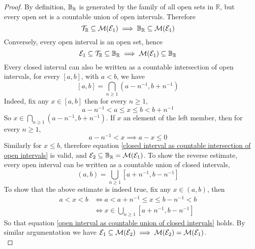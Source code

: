 \documentclass[../../main.tex]{subfiles}
\begin{document}
\begin{proof}
    By definition, $\borel$ is generated by the family of all open sets in $\mathbb{R}$, but every open set is a countable union of open intervals. Therefore
    \[
    \Tau_\mathbb{R}\subseteq \cal{M}(\cal{E}_1) \implies \borel\subseteq\cal{M}(\cal{E}_1)
    \]
    Conversely, every open interval is an open set, hence
    \[
    \cal{E}_1\subseteq \Tau_\mathbb{R}\subseteq\borel\implies\cal{M}(\cal{E}_1)\subseteq\borel
    \]
    Every closed interval can also be written as a countable intersection of open intervals, for every $[a,b]$, with $a<b$, we have
    \begin{equation}\label{closed interval as countable intersection of open intervals}
    [a,b] = \bigcap_{n\geq 1}(a-n^{-1},b+n^{-1})
    \end{equation}
    Indeed, fix any $x\in[a,b]$ then for every $n\geq 1$, 
    \[
    a-n^{-1}<a\leq x\leq b<b+n^{-1}
    \]
    So $x\in \bigcap_{n\geq 1} (a-n^{-1},b+n^{-1})$. If $x$ an element of the left member, then for every $n\geq 1$,
    \[
    a-n^{-1}<x\implies a-x\leq 0
    \]
    Similarly for $x\leq b$, therefore equation \eqref{closed interval as countable intersection of open intervals} is valid, and $\cal{E}_2\subseteq \borel=\cal{M}(\cal{E}_1)$. To show the reverse estimate, every open interval can be written as a countable union of closed intervals,
    \begin{equation}\label{open interval as countable union of closed intervals}
    (a,b)=\bigcup_{n\geq 1}[a+n^{-1},b-n^{-1}]
    \end{equation}
    To show that the above estimate is indeed true, fix any $x\in(a,b)$, then
    \begin{align*}
        a<x<b&\iff a<a+n^{-1}\leq x\leq b-n^{-1}<b\\
        &\iff x\in\bigcup_{n\geq 1}[a+n^{-1},b-n^{-1}]
    \end{align*}
    So that equation \eqref{open interval as countable union of closed intervals} holds. By similar argumentation we have $\cal{E}_1\subseteq\cal{M}(\cal{E}_2)\implies\cal{M}(\cal{E}_2)=\cal{M}(\cal{E}_1)$.\\
    

\end{proof}
\end{document}
